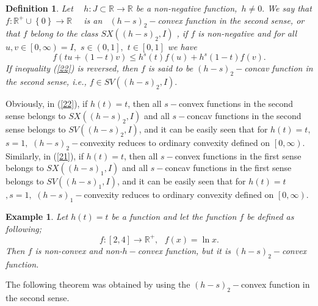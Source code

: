 \documentclass{amsart}
\theoremstyle{plain}
\newtheorem{definition}{Definition}
\newtheorem{example}{Example}
\numberwithin{equation}{section}
\begin{document}
\begin{definition}
Let $\ \ \ \ h:J\subset 
\mathbb{R}
\rightarrow 
\mathbb{R}
$ be a non-negative function,\ $h\neq 0.$ We say that $f:\mathbb{R}
^{+}\cup \left\{ 0\right\} \rightarrow 
\mathbb{R}
$ \ \ is an \ $(h-s)_{2}-$convex function in the second sense, or that $f$
belong to the class $SX(\left( h-s\right) _{2},I)$ , if $f$ is non-negative
and for all $u,v\in \left[ 0,\infty \right) =I,$ $s\in \left( 0,1\right] ,$ $t\in \left[ 0,1\right] $ we have\begin{equation}
f(tu+(1-t)v)\leq h^{s}(t)f(u)+h^{s}(1-t)f(v).  \label{22}
\end{equation}If inequality (\ref{22}) is reversed, then $f$ is said to be $(h-s)_{2}-$concav function in the second sense, i.e., $f\in SV(\left( h-s\right)
_{2},I).$\bigskip
\end{definition}

Obviously, in (\ref{22}), if $h(t)=t$, then all $s-$convex functions in the
second sense belongs to $SX(\left( h-s\right) _{2},I)$ and all $s-$concav
functions in the second sense belongs to $SV(\left( h-s\right) _{2},I)$, and
it can be easily seen that for $h(t)=t,$ $s=1,$ $(h-s)_{2}-$convexity
reduces to ordinary convexity defined on $\left[ 0,\infty \right) .$
Similarly, in (\ref{21}), if $h(t)=t$, then all $s-$convex functions in the
first sense belongs to $SX(\left( h-s\right) _{1},I)$ and all $s-$concav
functions in the first sense belongs to $SV(\left( h-s\right) _{1},I)$, and
it can be easily seen that for $h(t)=t$ $,s=1,$ $(h-s)_{1}-$convexity
reduces to ordinary convexity defined on $\left[ 0,\infty \right) .$

\begin{example}
Let $h(t)=t$ be a function and let the function $f$ be defined as following;\begin{equation*}
f:[2,4]\rightarrow 
\mathbb{R}
^{+},\text{ \ \ \ \ }f(x)=\ln x.
\end{equation*}Then $f$ is non-convex and non-$h-$convex function, but it is $(h-s)_{2}-$convex function.
\end{example}

The following theorem was obtained by using the $(h-s)_{2}-$convex function
in the second sense.
\end{document}
